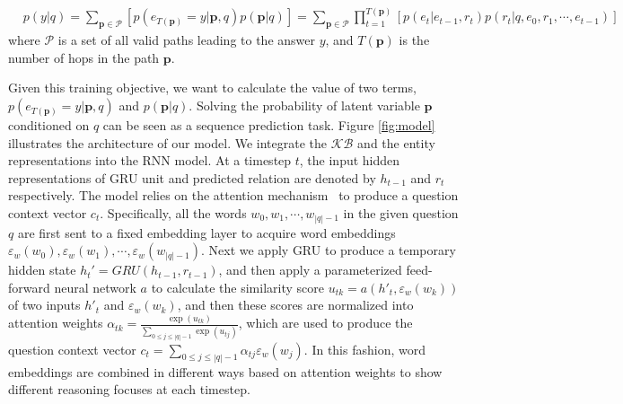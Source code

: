 \begin{align}
&p(y|q)\nonumber=\sum_{\mathbf{p}\in\mathcal{P}} [p(e_{T(\mathbf{p})}=y|\mathbf{p},q)p(\mathbf{p}|q)] \nonumber
=\sum_{\mathbf{p}\in\mathcal{P}}\prod_{t=1}^{T(\mathbf{p})} [p(e_t|e_{t-1},r_t) p(r_t|q,e_0,r_1,\cdots,e_{t-1})]
\label{eq:marginal}
\end{align}
where $\mathcal{P}$ is a set of all valid paths leading to the answer $y$, and $T(\mathbf{p})$ is the number of hops in the path $\mathbf{p}$.

Given this training objective, we want to calculate the value of two terms, $p(e_{T(\mathbf{p})}=y|\mathbf{p},q)$ and $p(\mathbf{p}|q)$. Solving the probability of latent variable $\mathbf{p}$ conditioned on $q$ can be seen as a sequence prediction task. Figure \ref{fig:model} illustrates the architecture of our model. We integrate the $\mathcal{KB}$ and the entity representations into the RNN model. At a timestep $t$, the input hidden representations of GRU unit and predicted relation are denoted by $h_{t-1}$ and $r_t$ respectively. The model relies on the attention mechanism~\cite{DBLP:journals/corr/BahdanauCB14} to produce a question context vector $c_t$. Specifically, all the words $w_0,w_1,\cdots,w_{|q|-1}$ in the given question $q$ are first sent to a fixed embedding layer to acquire word embeddings $\varepsilon_w(w_0),\varepsilon_w(w_1),\cdots,\varepsilon_w(w_{|q|-1})$. Next we apply GRU to produce a temporary hidden state $h_{t}'=GRU(h_{t-1}, r_{t-1})$, and then apply a parameterized feed-forward neural network $a$ to calculate the similarity score $u_{tk} = a(h'_{t},\varepsilon_w(w_k))$ of two inputs $h'_{t}$ and $\varepsilon_w(w_k)$, and then these scores are normalized into attention weights $\alpha_{tk}=\frac{\exp (u_{tk})}{\sum_{0\leq j\leq |q|-1}\exp (u_{tj})}$, which are used to produce the question context vector $c_t=\sum_{0\leq j\leq |q|-1}\alpha_{tj}\varepsilon_w(w_j)$. In this fashion, word embeddings are combined in different ways based on attention weights to show different reasoning focuses at each timestep.

